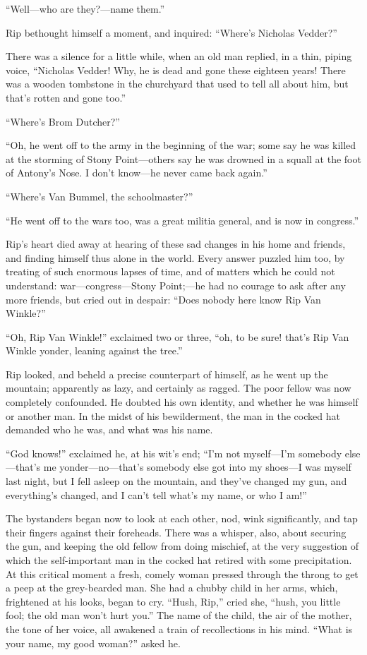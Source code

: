 “Well—who are they?—name them.”

Rip bethought himself a moment, and inquired: “Where’s Nicholas Vedder?”

There was a silence for a little while, when an old man replied, in a thin, piping voice, “Nicholas Vedder! Why, he is dead and gone these eighteen years! There was a wooden tombstone in the churchyard that used to tell all about him, but that’s rotten and gone too.”

“Where’s Brom Dutcher?”

“Oh, he went off to the army in the beginning of the war; some say he was killed at the storming of Stony Point—others say he was drowned in a squall at the foot of Antony’s Nose. I don’t know—he never came back again.”

“Where’s Van Bummel, the schoolmaster?”

“He went off to the wars too, was a great militia general, and is now in congress.”

Rip’s heart died away at hearing of these sad changes in his home and friends, and finding himself thus alone in the world. Every answer puzzled him too, by treating of such enormous lapses of time, and of matters which he could not understand: war—congress—Stony Point;—he had no courage to ask after any more friends, but cried out in despair: “Does nobody here know Rip Van Winkle?”

“Oh, Rip Van Winkle!” exclaimed two or three, “oh, to be sure! that’s Rip Van Winkle yonder, leaning against the tree.”

Rip looked, and beheld a precise counterpart of himself, as he went up the mountain; apparently as lazy, and certainly as ragged. The poor fellow was now completely confounded. He doubted his own identity, and whether he was himself or another man. In the midst of his bewilderment, the man in the cocked hat demanded who he was, and what was his name.

“God knows!” exclaimed he, at his wit’s end; “I’m not myself—I’m somebody else—that’s me yonder—no—that’s somebody else got into my shoes—I was myself last night, but I fell asleep on the mountain, and they’ve changed my gun, and everything’s changed, and I can’t tell what’s my name, or who I am!”

The bystanders began now to look at each other, nod, wink significantly, and tap their fingers against their foreheads. There was a whisper, also, about securing the gun, and keeping the old fellow from doing mischief, at the very suggestion of which the self-important man in the cocked hat retired with some precipitation. At this critical moment a fresh, comely woman pressed through the throng to get a peep at the grey-bearded man. She had a chubby child in her arms, which, frightened at his looks, began to cry. “Hush, Rip,” cried she, “hush, you little fool; the old man won’t hurt you.” The name of the child, the air of the mother, the tone of her voice, all awakened a train of recollections in his mind. “What is your name, my good woman?” asked he.

